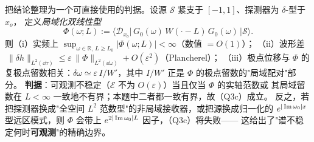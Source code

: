 把结论整理为一个可直接使用的判据。设源 $\mathcal S$ 紧支于 $[-1,1]$、探测器为 $\delta$-型于 $x_o$，
定义\emph{局域化双线性型}
\begin{equation}
\Phi(\omega;L):=\big\langle \mathcal D_{x_o}\big|\,G_0(\omega)\,W(\cdot-L)\,G_0(\omega)\,\big|\mathcal S\big\rangle .
\end{equation}
则（i）实频上 $\sup_{\omega\in\mathbb R,\,L\ge L_0}|\Phi(\omega;L)|<\infty$（数值 $=O(1)$）；
（ii）波形差
$\ \|\delta h\|_{L^2(\dd\tau)}\le \varepsilon\,\|\Phi\|_{L^2(\dd\omega)}
+O(\varepsilon^2)$（Plancherel）；
（iii）极点位移与 $\Phi$ 的复极点留数相关：$\delta\omega\simeq\varepsilon\, I/W'$，其中
$I/W'$ 正是 $\Phi$ 的极点留数的"局域配对"部分。
\textbf{判据}：可观测不稳定（$\mathcal E$ 不为 $O(\varepsilon)$）当且仅当 $\Phi$ 的实轴范数或
其局域留数在 $L<\infty$ 一致地不有界；本题中二者都一致有界，故（Q3c）成立。
反之，若把探测器换成"全空间 $L^2$ 范数型"的非局域接收器，或把源换成归一化的
$e^{|\operatorname{Im}\omega_0|x}$ 型远区模式，则 $\Phi$ 会带上 $e^{2|\operatorname{Im}\omega_0|L}$ 因子，（Q3c）将失败——
这给出了"谱不稳定何时\textbf{可观测}"的精确边界。
